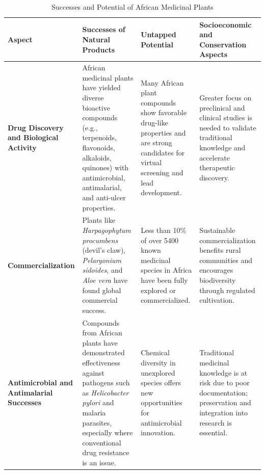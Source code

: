 \begin{center}
	\begin{landscape}
		\begin{table}[htbp]
			\centering
			\caption{Successes and Potential of African Medicinal Plants}
			\label{tab:success_plant}
			\begin{tabularx}{\linewidth}{>{\bfseries}p{5.5cm} X X X}
				\toprule
				\textbf{Aspect} & \textbf{Successes of Natural Products} & \textbf{Untapped Potential} & \textbf{Socioeconomic and Conservation Aspects} \\
				\midrule
				
				\textbf{Drug Discovery and Biological Activity} &
				African medicinal plants have yielded diverse bioactive compounds (e.g., terpenoids, flavonoids, alkaloids, quinones) with antimicrobial, antimalarial, and anti-ulcer properties. &
				Many African plant compounds show favorable drug-like properties and are strong candidates for virtual screening and lead development. &
				Greater focus on preclinical and clinical studies is needed to validate traditional knowledge and accelerate therapeutic discovery. \\
				
				\textbf{Commercialization} &
				Plants like \textit{Harpagophytum procumbens} (devil’s claw), \textit{Pelargonium sidoides}, and \textit{Aloe vera} have found global commercial success. &
				Less than \num{10}\% of over \num{5400} known medicinal species in Africa have been fully explored or commercialized. &
				Sustainable commercialization benefits rural communities and encourages biodiversity through regulated cultivation. \\
				
				\textbf{Antimicrobial and Antimalarial Successes} &
				Compounds from African plants have demonstrated effectiveness against pathogens such as \textit{Helicobacter pylori} and malaria parasites, especially where conventional drug resistance is an issue. &
				Chemical diversity in unexplored species offers new opportunities for antimicrobial innovation. &
				Traditional medicinal knowledge is at risk due to poor documentation; preservation and integration into research is essential. \\
				
				\bottomrule
			\end{tabularx}
		\end{table}
	\end{landscape}
\end{center}

